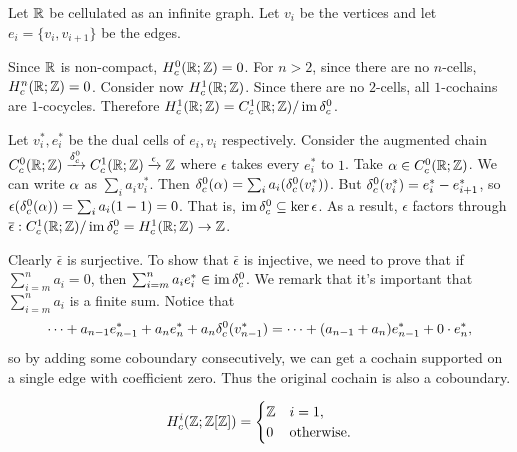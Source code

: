 \begin{example}
    \label{ex:compact-supported-cohomology-R}
    Let \(\mathbb{R}\) be cellulated as an infinite graph. Let \(v_i\) be the vertices and let \(e_i=\{v_i, v_{i+1}\}\) be the edges. 
    
    Since \(\mathbb{R}\) is non-compact, \(H^0_c(\mathbb{R};\mathbb{Z})=0\).  For \(n >2\), since there are no \(n\)-cells, \(H^n_c(\mathbb{R};\mathbb{Z})=0\). Consider now \(H^1_c(\mathbb{R};\mathbb{Z})\). Since there are no \(2\)-cells, all \(1\)-cochains are \(1\)-cocycles. Therefore \(H^1_c(\mathbb{R};\mathbb{Z})=C_c^1(\mathbb{R};\mathbb{Z})/\operatorname{im} \delta^0_c\).

    Let \(v_i^*, e_i^*\) be the dual cells of \(e_i, v_i\) respectively. 
    Consider the augmented chain \(C_c^0(\mathbb{R};\mathbb{Z}) \xrightarrow{\delta_c^0}C_c^1(\mathbb{R};\mathbb{Z}) \xrightarrow{\epsilon} \mathbb{Z}\) where \(\epsilon\) takes every \(e_i^*\) to \(1\).    
    Take \(\alpha \in C_c^0(\mathbb{R};\mathbb{Z})\). We can write \(\alpha\) as \(\sum_i a_i v_i^*\). Then \(\delta_c^0(\alpha) = \sum_i a_i(\delta_c^0(v_i^*))\). But \(\delta^0_c(v_i^*) = e_i^*-e_{i+1}^*\), so \(\epsilon(\delta_c^0(\alpha)) = \sum_i a_i (1-1) =0\). That is, \(\operatorname{im}\delta_c^0\subseteq \ker \epsilon\). As a result, \(\epsilon\) factors through \(\overline \epsilon :C_c^1(\mathbb{R};\mathbb{Z})/\operatorname{im}\delta_c^0 = H^1_c(\mathbb{R};\mathbb{Z}) \to \mathbb{Z}\).

    Clearly \(\bar \epsilon\) is surjective. To show that \(\bar \epsilon\) is injective, we need to prove that if \(\sum_{i=m}^n a_i =0\), then \(\sum_{i=m}^n a_i e_i^* \in \operatorname{im}\delta_c^0\). We remark that it's important that \(\sum_{i=m}^n a_i\) is a finite sum.   
    Notice that  \[ \cdots + a_{n-1} e_{n-1}^* + a_n e_n^* + a_n \delta_c^0(v_{n-1}^*) = \cdots +(a_{n-1}+a_n) e_{n-1}^* +0\cdot e_n^*, \]
    so by adding some coboundary consecutively, we can get a cochain supported on a single edge with coefficient zero. Thus the original cochain is also a coboundary.
\end{example}

\begin{corollary}
    \begin{align*}
        H^i_c(\mathbb{Z};\mathbb{Z}[\mathbb{Z}]) = \begin{cases}
            \mathbb{Z} & i=1,\\
            0 & \text{otherwise}.
        \end{cases}
    \end{align*}
\end{corollary}

